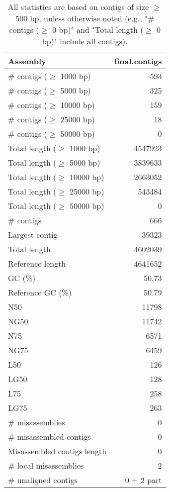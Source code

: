 \documentclass[12pt,a4paper]{article}
\begin{document}
\begin{table}[ht]
\begin{center}
\caption{All statistics are based on contigs of size $\geq$ 500 bp, unless otherwise noted (e.g., "\# contigs ($\geq$ 0 bp)" and "Total length ($\geq$ 0 bp)" include all contigs).}
\begin{tabular}{|l*{1}{|r}|}
\hline
Assembly & final.contigs \\ \hline
\# contigs ($\geq$ 1000 bp) & 593 \\ \hline
\# contigs ($\geq$ 5000 bp) & 325 \\ \hline
\# contigs ($\geq$ 10000 bp) & 159 \\ \hline
\# contigs ($\geq$ 25000 bp) & 18 \\ \hline
\# contigs ($\geq$ 50000 bp) & 0 \\ \hline
Total length ($\geq$ 1000 bp) & 4547923 \\ \hline
Total length ($\geq$ 5000 bp) & 3839633 \\ \hline
Total length ($\geq$ 10000 bp) & 2663052 \\ \hline
Total length ($\geq$ 25000 bp) & 543484 \\ \hline
Total length ($\geq$ 50000 bp) & 0 \\ \hline
\# contigs & 666 \\ \hline
Largest contig & 39323 \\ \hline
Total length & 4602039 \\ \hline
Reference length & 4641652 \\ \hline
GC (\%) & 50.73 \\ \hline
Reference GC (\%) & 50.79 \\ \hline
N50 & 11798 \\ \hline
NG50 & 11742 \\ \hline
N75 & 6571 \\ \hline
NG75 & 6459 \\ \hline
L50 & 126 \\ \hline
LG50 & 128 \\ \hline
L75 & 258 \\ \hline
LG75 & 263 \\ \hline
\# misassemblies & 0 \\ \hline
\# misassembled contigs & 0 \\ \hline
Misassembled contigs length & 0 \\ \hline
\# local misassemblies & 2 \\ \hline
\# unaligned contigs & 0 + 2 part \\ \hline

\end{tabular}
\end{center}
\end{table}
\end{document}
